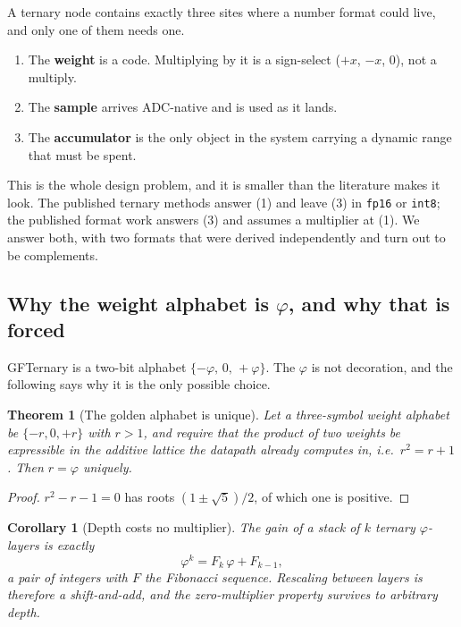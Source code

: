 \documentclass[11pt]{article}
\newtheorem{theorem}{Theorem}
\newtheorem{corollary}{Corollary}
\theoremstyle{definition}
\begin{document}
A ternary node contains exactly three sites where a number format could live, and
only one of them needs one.

\begin{enumerate}
\item The \textbf{weight} is a code. Multiplying by it is a sign-select
      ($+x$, $-x$, $0$), not a multiply.
\item The \textbf{sample} arrives ADC-native and is used as it lands.
\item The \textbf{accumulator} is the only object in the system carrying a
      dynamic range that must be spent.
\end{enumerate}

This is the whole design problem, and it is smaller than the literature makes it
look. The published ternary methods answer (1) and leave (3) in \texttt{fp16} or
\texttt{int8}; the published format work answers (3) and assumes a multiplier at
(1). We answer both, with two formats that were derived independently and turn
out to be complements.

\subsection{Why the weight alphabet is \texorpdfstring{$\varphi$}{phi}, and why that is forced}

GFTernary is a two-bit alphabet $\{-\varphi,\,0,\,+\varphi\}$. The $\varphi$ is
not decoration, and the following says why it is the only possible choice.

\begin{theorem}[The golden alphabet is unique]
\label{thm:goldalpha}
Let a three-symbol weight alphabet be $\{-r,0,+r\}$ with $r>1$, and require that
the product of two weights be expressible in the additive lattice the datapath
already computes in, i.e.\ $r^2 = r + 1$. Then $r = \varphi$ uniquely.
\end{theorem}
\begin{proof}
$r^2 - r - 1 = 0$ has roots $(1\pm\sqrt5)/2$, of which one is positive.
\end{proof}

\begin{corollary}[Depth costs no multiplier]
\label{cor:depth}
The gain of a stack of $k$ ternary $\varphi$-layers is exactly
\[
  \varphi^{k} = F_k\,\varphi + F_{k-1},
\]
a pair of integers with $F$ the Fibonacci sequence. Rescaling between layers is
therefore a shift-and-add, and the zero-multiplier property survives to arbitrary
depth.
\end{corollary}
\end{document}
